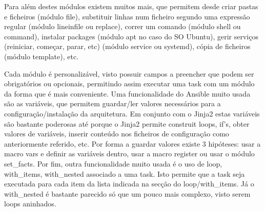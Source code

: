 \documentclass{article}
\begin{document}
Para além destes módulos existem muitos mais, que permitem desde criar pastas e ficheiros (módulo file), substituir linhas num ficheiro segundo uma expressão regular (módulo lineinfile ou replace), correr um comando (módulo shell ou command), instalar packages (módulo apt no caso do SO Ubuntu), gerir serviços (reiniciar, começar, parar, etc) (módulo service ou systemd), cópia de ficheiros (módulo template), etc.

Cada módulo é personalizável, visto possuir campos a preencher que podem ser obrigatórios ou opcionais, permitindo assim executar uma task com um módulo da forma que é mais conveniente.
Uma funcionalidade do Ansible muito usada são as variáveis, que permitem guardar/ler valores necessários para a configuração/instalação da arquitetura. Em conjunto com o Jinja2 estas variáveis são bastante poderosas até porque o Jinja2 permite construit loops, if's, obter valores de variáveis, inserir conteúdo nos ficheiros de configuração como anteriormente referido, etc. Por forma a guardar valores existe 3 hipóteses: usar a macro vars e definir as variáveis dentro, usar a macro register ou usar o módulo set\_facts.
Por fim, outra funcionalidade muito usada é o uso de loop, with\_items, with\_nested associado a uma task. Isto permite que a task seja executada para cada item da lista indicada na secção do loop/with\_items. Já o with\_nested é bastante parecido só que um pouco mais complexo, visto serem loops aninhados.
\end{document}
